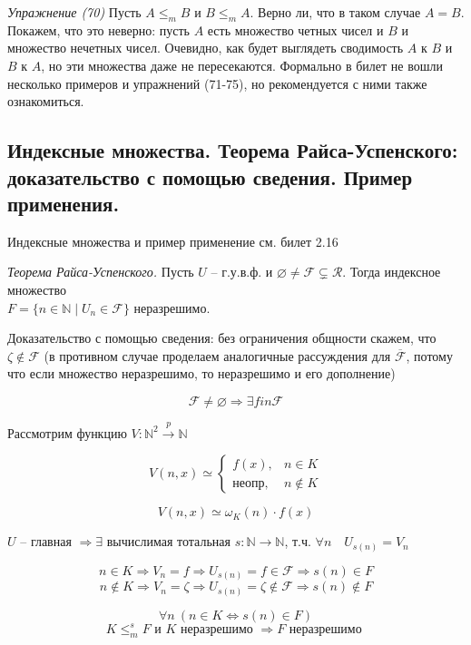 \documentclass[a4paper, 10pt]{article}
\newcommand{\FF}{\mathcal{F}}
\newcommand{\RR}{\mathcal{R}}
\begin{document}
\hfill

\textit{Упражнение (70)} Пусть $A \leq_m B$ и $B \leq_m A$. Верно ли, что в таком случае $A = B$.
Покажем, что это неверно: пусть $A$ есть множество четных чисел и $B$ и множество нечетных чисел. Очевидно, как будет выглядеть сводимость $A$ к $B$ и $B$ к $A$, но эти множества даже не пересекаются.
Формально в билет не вошли несколько примеров и упражнений (71-75), но рекомендуется с ними также ознакомиться.

\subsection{Индексные множества. Теорема Райса-Успенского: доказательство с помощью
сведения. Пример применения.}

Индексные множества и пример применение см. билет 2.16

\textit{Теорема Райса-Успенского.} Пусть $U$ -- г.у.в.ф. и $\varnothing \ne \FF \subsetneq \RR$. Тогда индексное множество \\ $F = \{ n\in \mathbb{N} \mid U_n \in \FF \}$ неразрешимо.

Доказательство с помощью сведения: без ограничения общности скажем, что $\zeta \notin \FF$ (в противном случае проделаем аналогичные рассуждения для $\overline{\FF}$, потому что если множество неразрешимо, то неразрешимо и его дополнение)

$$ \FF \ne \varnothing \Rightarrow \exists f in \FF $$

Рассмотрим функцию $V: \mathbb{N}^2 \stackrel{p}{\to} \mathbb{N}$

$$ V(n, x) \simeq \begin{cases}
    f(x), & n \in K \\
    \text{неопр}, & n \notin K
\end{cases} $$

$$ V(n, x) \simeq \omega_K(n) \cdot f(x) $$

$U$ -- главная $ \Rightarrow \exists $ вычислимая тотальная $s: \mathbb{N} \to \mathbb{N} $, т.ч. $\forall n \quad U_{s(n)}=V_n$

$$ n \in K \Rightarrow V_n = f \Rightarrow U_{s(n)} = f \in \FF \Rightarrow s(n) \in F $$
$$ n \notin K \Rightarrow V_n = \zeta \Rightarrow U_{s(n)} = \zeta \notin \FF \Rightarrow s(n) \notin F $$

$$ \forall n \: (n \in K \Leftrightarrow s(n) \in F)$$
$$ K \leqslant_m^s F \text{ и } K \text{ неразрешимо } \Rightarrow F \text{ неразрешимо } $$
\end{document}

